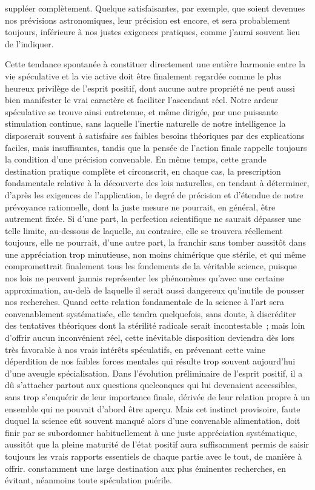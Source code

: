 \documentclass[french,twoside]{book} %
\begin{document}
suppléer complètement. Quelque satisfaisantes, par exemple, que soient devenues nos prévisions astronomiques, leur précision est encore, et sera probablement toujours, inférieure à nos justes exigences pratiques, comme j’aurai souvent lieu de l’indiquer.\par
Cette tendance spontanée à constituer directement une entière harmonie entre la vie spéculative et la vie active doit être finalement regardée comme le plus heureux privilège de l’esprit positif, dont aucune autre propriété ne peut aussi bien manifester le vrai caractère et faciliter l’ascendant réel. Notre ardeur spéculative se trouve ainsi entretenue, et même dirigée, par une puissante stimulation continue, sans laquelle l’inertie naturelle de notre intelligence la disposerait souvent à satisfaire ses faibles besoins théoriques par des explications faciles, mais insuffisantes, tandis que la pensée de l’action finale rappelle toujours la condition d’une précision convenable. En même temps, cette grande destination pratique complète et circonscrit, en chaque cas, la prescription fondamentale relative à la découverte des lois naturelles, en tendant à déterminer, d’après les exigences de l’application, le degré de précision et d’étendue de notre prévoyance rationnelle, dont la juste mesure ne pourrait, en général, être autrement fixée. Si d’une part, la perfection scientifique ne saurait dépasser une telle limite, au-dessous de laquelle, au contraire, elle se trouvera réellement toujours, elle ne pourrait, d’une autre part, la franchir sans tomber aussitôt dans une appréciation trop minutieuse, non moins chimérique que stérile, et qui même compromettrait finalement tous les fondements de la véritable science, puisque nos lois ne peuvent jamais représenter les phénomènes qu’avec une certaine approximation, au-delà de laquelle il serait aussi dangereux qu’inutile de pousser nos recherches. Quand cette relation fondamentale de la science à l’art sera convenablement systématisée, elle tendra quelquefois, sans doute, à discréditer des tentatives théoriques dont la stérilité radicale serait incontestable ; mais loin d’offrir aucun inconvénient réel, cette inévitable disposition deviendra dès lors très favorable à nos vrais intérêts spéculatifs, en prévenant cette vaine déperdition de nos faibles forces mentales qui résulte trop souvent aujourd’hui d’une aveugle spécialisation. Dans l’évolution préliminaire de l’esprit positif, il a dû s’attacher partout aux questions quelconques qui lui devenaient accessibles, sans trop s’enquérir de leur importance finale, dérivée de leur relation propre à un ensemble qui ne pouvait d’abord être aperçu. Mais cet instinct provisoire, faute duquel la science eût souvent manqué alors d’une convenable alimentation, doit finir par se subordonner habituellement à une juste appréciation systématique, aussitôt que la pleine maturité de l’état positif aura suffisamment permis de saisir toujours les vrais rapports essentiels de chaque partie avec le tout, de manière à offrir. constamment une large destination aux plus éminentes recherches, en évitant, néanmoins toute spéculation puérile.\par
\end{document}
